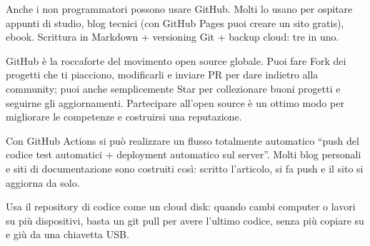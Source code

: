 
Anche i non programmatori possono usare GitHub. Molti lo usano per ospitare appunti di studio, blog tecnici (con GitHub Pages puoi creare un sito gratis), ebook. Scrittura in Markdown + versioning Git + backup cloud: tre in uno.


GitHub è la roccaforte del movimento open source globale. Puoi fare Fork dei progetti che ti piacciono, modificarli e inviare PR per dare indietro alla community; puoi anche semplicemente Star per collezionare buoni progetti e seguirne gli aggiornamenti. Partecipare all'open source è un ottimo modo per migliorare le competenze e costruirsi una reputazione.


Con GitHub Actions si può realizzare un flusso totalmente automatico “push del codice test automatici + deployment automatico sul server”. Molti blog personali e siti di documentazione sono costruiti così: scritto l'articolo, si fa push e il sito si aggiorna da solo.


Usa il repository di codice come un cloud disk: quando cambi computer o lavori su più dispositivi, basta un git pull per avere l'ultimo codice, senza più copiare su e giù da una chiavetta USB.



